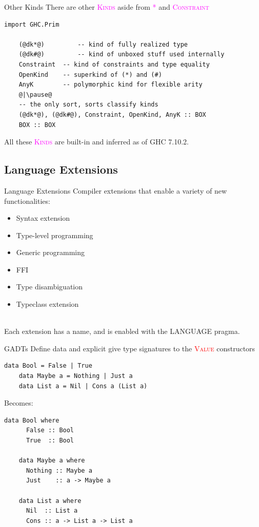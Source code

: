 \documentclass[xcolor={usenames,dvipsnames}]{beamer}
\newcommand{\hvalcon}[1]{\textcolor{Red}{\textsc{#1}}}
\newcommand{\hkind}[1]{\textcolor{Fuchsia}{\textsc{#1}}}
\begin{document}
\begin{frame}[fragile]{Other Kinds}
  There are other \hkind{Kinds} aside from \hkind{*} and \hkind{Constraint}
  \begin{lstlisting}[style=hask]
    import GHC.Prim
    
    (@dk*@)         -- kind of fully realized type
    (@dk#@)         -- kind of unboxed stuff used internally
    Constraint  -- kind of constraints and type equality
    OpenKind    -- superkind of (*) and (#)
    AnyK        -- polymorphic kind for flexible arity
    @|\pause@
    -- the only sort, sorts classify kinds
    (@dk*@), (@dk#@), Constraint, OpenKind, AnyK :: BOX
    BOX :: BOX
  \end{lstlisting}

  All these \hkind{Kinds} are built-in and inferred as of GHC 7.10.2.
\end{frame}


\subsection{Language Extensions}

\begin{frame}[fragile]{Language Extensions}
  Compiler extensions that enable a variety of new functionalities:
  \pause
  \begin{itemize}
    \item Syntax extension
    \item Type-level programming
    \item Generic programming
    \item FFI
    \item Type disambiguation
    \item Typeclass extension
  \end{itemize}

  \ \\
  \pause
  Each extension has a name, and is enabled with the LANGUAGE pragma.
\end{frame}

\begin{frame}[fragile]{GADTs}
  Define data and explicit give type signatures to the \hvalcon{Value} constructors
  \begin{lstlisting}[style=hask]
    data Bool = False | True
    data Maybe a = Nothing | Just a
    data List a = Nil | Cons a (List a)
  \end{lstlisting}

  Becomes:
  \begin{lstlisting}[style=hask]
    data Bool where
      False :: Bool
      True  :: Bool

    data Maybe a where
      Nothing :: Maybe a
      Just    :: a -> Maybe a

    data List a where
      Nil  :: List a
      Cons :: a -> List a -> List a
  \end{lstlisting}
\end{frame}
\end{document}

